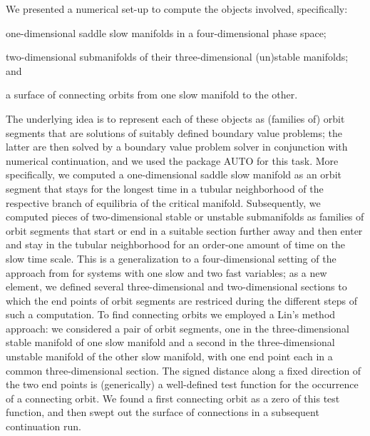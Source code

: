 \documentclass{ws-ijbc}
\begin{document}
We presented a numerical set-up to compute the objects involved, specifically: \\[-6mm]
%
\begin{list}{()}{
    \setlength{\leftmargin}{9mm} \setlength{\labelwidth}{9mm} \setlength{\itemsep}{0mm}}
\item
one-dimensional saddle slow manifolds in a four-dimensional phase space; \\[-4mm]
\item
two-dimensional submanifolds of their three-dimensional (un)stable manifolds; and \\[-4mm]
\item
a surface of connecting orbits from one slow manifold to the other. \\[-5mm]
\end{list}
%
The underlying idea is to represent each of these objects as (families of) orbit segments that are solutions of suitably defined boundary value problems; the latter are then solved by a boundary value problem solver in conjunction with numerical continuation, and we used the package \textsc{AUTO} for this task. More specifically, we computed a one-dimensional saddle slow manifold as an orbit segment that stays for the longest time in a tubular neighborhood of the respective branch of equilibria of the critical manifold. Subsequently, we computed pieces of two-dimensional stable or unstable submanifolds as families of orbit segments that start or end in a suitable section further away and then enter and stay in the tubular neighborhood for an order-one amount of time on the slow time scale. This is a generalization to a four-dimensional setting of the approach from \cite{Saeed_Paper} for systems with one slow and two fast variables; as a new element, we defined several three-dimensional and two-dimensional sections to which the end points of orbit segments are restriced during the different steps of such a computation. To find connecting orbits we employed a Lin's method approach: we considered a pair of orbit segments, one in the three-dimensional stable manifold of one slow manifold and a second in the three-dimensional unstable manifold of the other slow manifold, with one end point each in a common three-dimensional section. The signed distance along a fixed direction of the two end points is (generically) a well-defined test function for the occurrence of a connecting orbit. We found a first connecting orbit as a zero of this test function, and then swept out the surface of connections in a subsequent continuation run.
\end{document}
